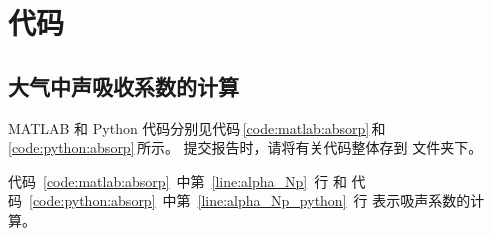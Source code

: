 \chapter{代码}

\zhlipsum[2]
\section{大气中声吸收系数的计算}
MATLAB 和 Python 代码分别见代码\,\ref{code:matlab:absorp}\,和\,\ref{code:python:absorp}\,所示。
提交报告时，请将有关代码整体存到  文件夹下。

代码~\ref{code:matlab:absorp}~中第~\ref{line:alpha_Np}~行
和
代码~\ref{code:python:absorp}~中第~\ref{line:alpha_Np_python}~行
表示吸声系数的计算。





